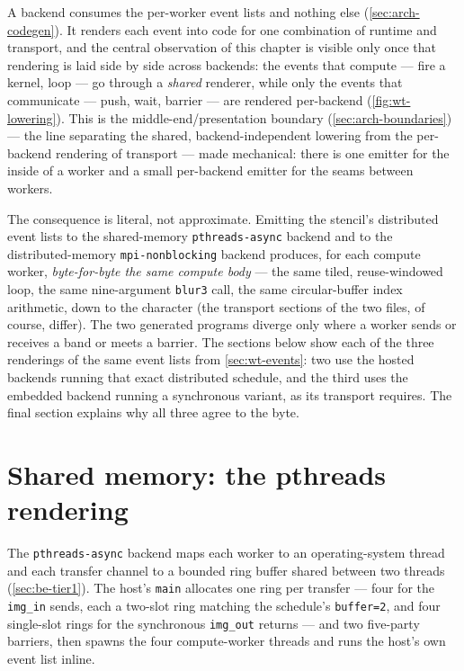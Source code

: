 A backend consumes the per-worker event lists and nothing else
(\cref{sec:arch-codegen}). It renders each event into code for one combination of
runtime and transport, and the central observation of this chapter is visible only
once that rendering is laid side by side across backends: the events that compute
--- fire a kernel, loop --- go through a \emph{shared} renderer, while only the events
that communicate --- push, wait, barrier --- are rendered per-backend
(\cref{fig:wt-lowering}). This is the middle-end/presentation boundary
(\cref{sec:arch-boundaries}) --- the line separating the shared, backend-independent
lowering from the per-backend rendering of transport --- made mechanical: there is one
emitter for the inside of a worker and a small per-backend emitter for the seams
between workers.



The consequence is literal, not approximate. Emitting the stencil's distributed event
lists to the shared-memory \texttt{pthreads-async} backend and to the
distributed-memory \texttt{mpi-nonblocking} backend produces, for each compute
worker, \emph{byte-for-byte the same compute body} --- the same tiled, reuse-windowed
loop, the same nine-argument \texttt{blur3} call, the same circular-buffer index
arithmetic, down to the character (the transport sections of the two files, of
course, differ). The two generated programs diverge only where a worker sends or
receives a band or meets a barrier. The sections below show each of the three
renderings of the same event lists from \cref{sec:wt-events}: two use the hosted
backends running that exact distributed schedule, and the third uses the embedded
backend running a synchronous variant, as its transport requires. The final section
explains why all three agree to the byte.

\section{Shared memory: the pthreads rendering}\label{sec:wt-pthreads}

The \texttt{pthreads-async} backend maps each worker to an operating-system thread
and each transfer channel to a bounded ring buffer shared between two threads
(\cref{sec:be-tier1}). The host's \texttt{main} allocates one ring per transfer ---
four for the \texttt{img\_in} sends, each a two-slot ring matching the schedule's
\texttt{buffer=2}, and four single-slot rings for the synchronous \texttt{img\_out}
returns --- and two five-party barriers, then spawns the four compute-worker threads
and runs the host's own event list inline.

